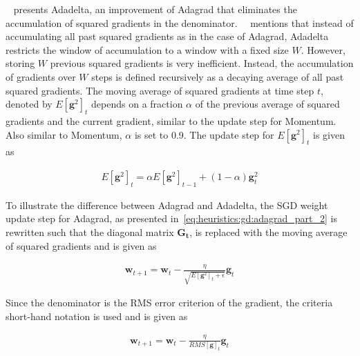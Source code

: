 \citeauthor{ref:zeiler:2012}~\cite{ref:zeiler:2012} presents \acs{Adadelta}, an improvement of \acs{Adagrad} that eliminates the accumulation of squared gradients in the denominator.~\citeauthor{ref:ruder:2016}~\cite{ref:ruder:2016} mentions that instead of accumulating all past squared gradients as in the case of \acs{Adagrad}, \acs{Adadelta} restricts the window of accumulation to a window with a fixed size $W$. However, storing $W$ previous squared gradients is very inefficient. Instead, the accumulation of gradients over $W$ steps is defined recursively as a decaying average of all past squared gradients. The moving average of squared gradients at time step $t$, denoted by $E[\boldsymbol{g}^{2}]_{t}$  depends on a fraction $\alpha$ of the previous average of squared gradients and the current gradient, similar to the update step for \acs{Momentum}. Also similar to \acs{Momentum}, $\alpha$ is set to 0.9. The update step for $E[\boldsymbol{g}^{2}]_{t}$ is given as

\begin{equation}
	\label{eq:heuristics:gd:adadelta_part_1}
	\begin{split}
		E[\boldsymbol{g}^{2}]_{t} = \alpha E[\boldsymbol{g}^{2}]_{t - 1} + (1 - \alpha)\boldsymbol{g}_{t}^{2}
	\end{split}
\end{equation}

To illustrate the difference between \acs{Adagrad} and \acs{Adadelta}, the \acs{SGD} weight update step for \acs{Adagrad}, as presented in~\eqref{eq:heuristics:gd:adagrad_part_2} is rewritten such that the diagonal matrix $\boldsymbol{G_{t}}$, is replaced with the moving average of squared gradients and is given as

\begin{equation}
	\label{eq:heuristics:gd:adadelta_part_2}
	\begin{split}
		\boldsymbol{w}_{t+1} = \boldsymbol{w}_{t} - \frac{\eta}{\sqrt{E[\boldsymbol{g}^{2}]_{t} + \epsilon}} \boldsymbol{g}_{t}
	\end{split}
\end{equation}

Since the denominator is the \acf{RMS} error criterion of the gradient, the criteria short-hand notation is used and is given as

\begin{equation}
	\label{eq:heuristics:gd:adadelta_part_3}
	\begin{split}
		\boldsymbol{w}_{t+1} = \boldsymbol{w}_{t} - \frac{\eta}{RMS[\boldsymbol{g}]_{t}} \boldsymbol{g}_{t}
	\end{split}
\end{equation}

